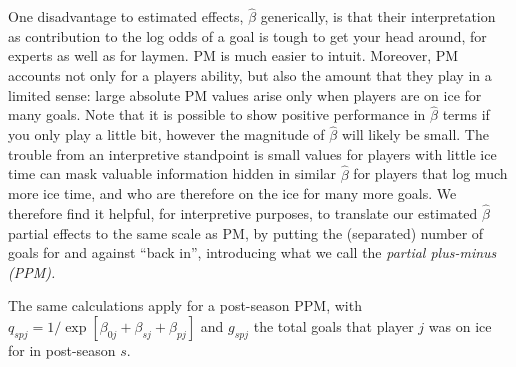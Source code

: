 One disadvantage to estimated effects, $\hat{\beta}$ generically, is that
their interpretation as contribution to the log odds of a goal is tough to get
your head around, for experts as well as for laymen.  PM is much easier to
intuit. Moreover, PM accounts not only for a players ability, but also the
amount that they play in a limited sense: large absolute PM values arise only
when players are on ice for many goals.  Note that it is possible to show
positive performance in $\hat{\beta}$ terms if you only play a little bit,
however the magnitude of $\hat{\beta}$ will likely be small.  The trouble from
an interpretive standpoint is small values for players with little ice time
can mask valuable information hidden in similar $\hat{\beta}$ for players that
log much more ice time, and who are therefore on the ice for many more goals.
We therefore find it helpful, for interpretive purposes, to translate our
estimated $\hat{\beta}$ partial effects to the same scale as PM, by putting
the (separated) number of goals for and against ``back in'', introducing what
we call the {\em partial plus-minus (PPM).}
The same calculations apply for a post-season PPM, with $q_{spj} =
1/\exp[\beta_{0j} + \beta_{sj}+ \beta_{pj}]$ and $g_{spj}$ the total goals
that player $j$ was on ice for in post-season $s$.

